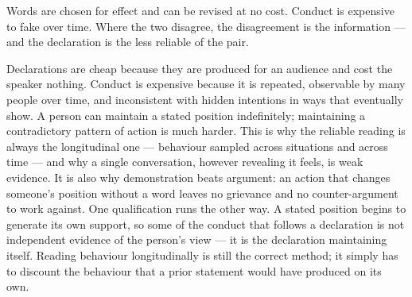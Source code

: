


\begin{core}
Words are chosen for effect and can be revised at no cost. Conduct is expensive to fake over time. Where the two disagree, the disagreement is the information --- and the declaration is the less reliable of the pair.
\end{core}

\begin{mechanism}
Declarations are cheap because they are produced for an audience and cost the speaker nothing. Conduct is expensive because it is repeated, observable by many people over time, and inconsistent with hidden intentions in ways that eventually show. A person can maintain a stated position indefinitely; maintaining a contradictory pattern of action is much harder. This is why the reliable reading is always the longitudinal one --- behaviour sampled across situations and across time --- and why a single conversation, however revealing it feels, is weak evidence. It is also why demonstration beats argument: an action that changes someone's position without a word leaves no grievance and no counter-argument to work against. One qualification runs the other way. A stated position begins to generate its own support, so some of the conduct that follows a declaration is not independent evidence of the person's view --- it is the declaration maintaining itself. Reading behaviour longitudinally is still the correct method; it simply has to discount the behaviour that a prior statement would have produced on its own.
\end{mechanism}

